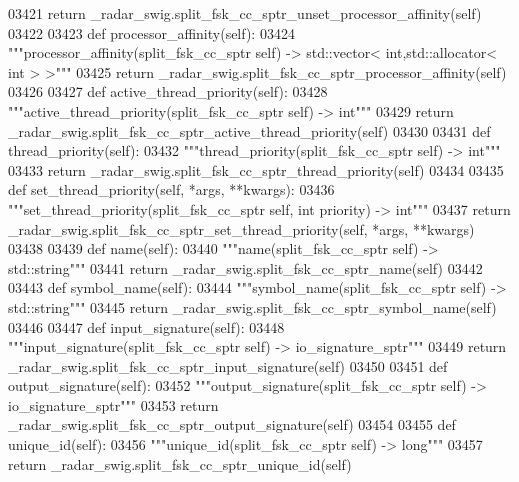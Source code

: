 \begin{DoxyCode}
{{{{{{{{{{{{03421         \textcolor{keywordflow}{return} \_radar\_swig.split\_fsk\_cc\_sptr\_unset\_processor\_affinity(self)
03422 
03423     \textcolor{keyword}{def }processor_affinity(self):
03424         \textcolor{stringliteral}{"""processor\_affinity(split\_fsk\_cc\_sptr self) -> std::vector< int,std::allocator< int > >"""}
03425         \textcolor{keywordflow}{return} \_radar\_swig.split\_fsk\_cc\_sptr\_processor\_affinity(self)
03426 
03427     \textcolor{keyword}{def }active_thread_priority(self):
03428         \textcolor{stringliteral}{"""active\_thread\_priority(split\_fsk\_cc\_sptr self) -> int"""}
03429         \textcolor{keywordflow}{return} \_radar\_swig.split\_fsk\_cc\_sptr\_active\_thread\_priority(self)
03430 
03431     \textcolor{keyword}{def }thread_priority(self):
03432         \textcolor{stringliteral}{"""thread\_priority(split\_fsk\_cc\_sptr self) -> int"""}
03433         \textcolor{keywordflow}{return} \_radar\_swig.split\_fsk\_cc\_sptr\_thread\_priority(self)
03434 
03435     \textcolor{keyword}{def }set_thread_priority(self, *args, **kwargs):
03436         \textcolor{stringliteral}{"""set\_thread\_priority(split\_fsk\_cc\_sptr self, int priority) -> int"""}
03437         \textcolor{keywordflow}{return} \_radar\_swig.split\_fsk\_cc\_sptr\_set\_thread\_priority(self, *args, **kwargs)
03438 
03439     \textcolor{keyword}{def }name(self):
03440         \textcolor{stringliteral}{"""name(split\_fsk\_cc\_sptr self) -> std::string"""}
03441         \textcolor{keywordflow}{return} \_radar\_swig.split\_fsk\_cc\_sptr\_name(self)
03442 
03443     \textcolor{keyword}{def }symbol_name(self):
03444         \textcolor{stringliteral}{"""symbol\_name(split\_fsk\_cc\_sptr self) -> std::string"""}
03445         \textcolor{keywordflow}{return} \_radar\_swig.split\_fsk\_cc\_sptr\_symbol\_name(self)
03446 
03447     \textcolor{keyword}{def }input_signature(self):
03448         \textcolor{stringliteral}{"""input\_signature(split\_fsk\_cc\_sptr self) -> io\_signature\_sptr"""}
03449         \textcolor{keywordflow}{return} \_radar\_swig.split\_fsk\_cc\_sptr\_input\_signature(self)
03450 
03451     \textcolor{keyword}{def }output_signature(self):
03452         \textcolor{stringliteral}{"""output\_signature(split\_fsk\_cc\_sptr self) -> io\_signature\_sptr"""}
03453         \textcolor{keywordflow}{return} \_radar\_swig.split\_fsk\_cc\_sptr\_output\_signature(self)
03454 
03455     \textcolor{keyword}{def }unique_id(self):
03456         \textcolor{stringliteral}{"""unique\_id(split\_fsk\_cc\_sptr self) -> long"""}
03457         \textcolor{keywordflow}{return} \_radar\_swig.split\_fsk\_cc\_sptr\_unique\_id(self)
}}}}}}}}}}}}
\end{DoxyCode}
